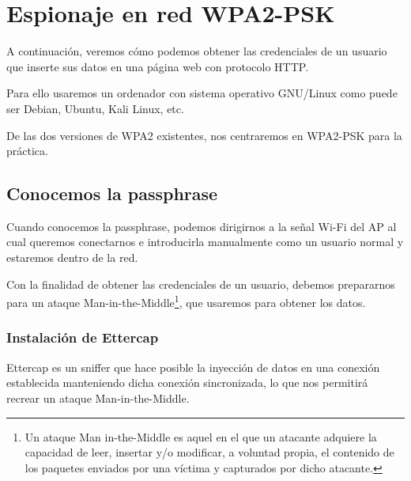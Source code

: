 \chapter{Espionaje en red WPA2-PSK}
A continuación, veremos cómo podemos obtener las credenciales de un usuario que inserte sus datos en una página web con protocolo HTTP.

Para ello usaremos un ordenador con sistema operativo GNU/Linux como puede ser Debian, Ubuntu, Kali Linux, etc.

\Nota De las dos versiones de WPA2 existentes, nos centraremos en WPA2-PSK para la práctica.
\section{Conocemos la passphrase}
Cuando conocemos la passphrase, podemos dirigirnos a la señal Wi-Fi del AP al cual queremos conectarnos e introducirla manualmente como un usuario normal y estaremos dentro de la red.

Con la finalidad de obtener las credenciales de un usuario, debemos prepararnos para un ataque Man-in-the-Middle\footnote{Un ataque Man in-the-Middle es aquel en el que un atacante adquiere la capacidad de leer, insertar y/o modificar, a voluntad propia, el contenido de los paquetes enviados por una víctima y capturados por dicho atacante.}, que usaremos para obtener los datos.

\subsection{Instalación de Ettercap}
Ettercap es un sniffer que hace posible la inyección de datos en una conexión establecida manteniendo dicha conexión sincronizada, lo que nos permitirá recrear un ataque Man-in-the-Middle.

